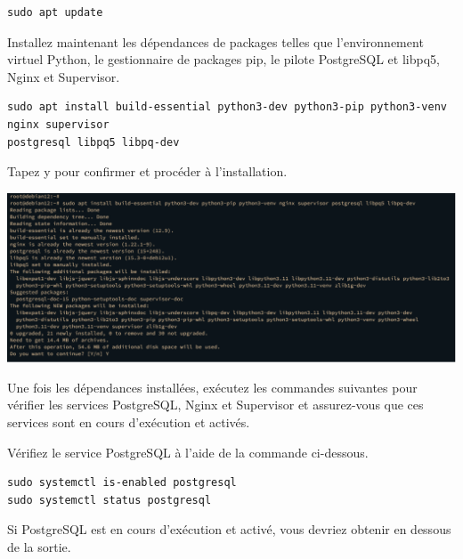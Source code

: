 \documentclass{article}
\begin{document}
\begin{verbatim}
sudo apt update
\end{verbatim}

Installez maintenant les dépendances de packages telles que l'environnement virtuel Python, le gestionnaire de packages pip, le pilote PostgreSQL et libpq5, Nginx et Supervisor.


\begin{verbatim}
sudo apt install build-essential python3-dev python3-pip python3-venv nginx supervisor 
postgresql libpq5 libpq-dev
\end{verbatim}

Tapez y pour confirmer et procéder à l’installation.
\begin{center}
\includegraphics[width=15cm]{images/image01.png}
\end{center}
Une fois les dépendances installées, exécutez les commandes suivantes pour vérifier les services PostgreSQL, Nginx et Supervisor et assurez-vous que ces services sont en cours d'exécution et activés.


Vérifiez le service PostgreSQL à l'aide de la commande ci-dessous.
\begin{verbatim}
sudo systemctl is-enabled postgresql
sudo systemctl status postgresql
\end{verbatim}

Si PostgreSQL est en cours d'exécution et activé, vous devriez obtenir en dessous de la sortie.
\end{document}
